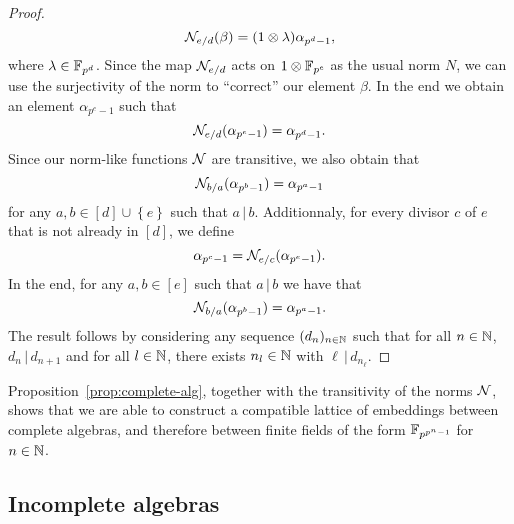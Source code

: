 \documentclass{sig-alternate}
\begin{document}
\begin{proof}
\[
  \mathcal{N}_{e/d}(\beta)=(1\otimes\lambda)\alpha_{p^{d}-1},
\]
where $\lambda\in\mathbb{F}_{p^d}$. Since the map
$\mathcal{N}_{e/d}$ acts on $1\otimes\mathbb{F}_{p^{e}}$ as the
usual norm $N$, we can use
the surjectivity of the norm to ``correct'' our element $\beta$. In the end we
obtain an element $\alpha_{p^{e}-1}$ such
that
\[
  \mathcal{N}_{e/d}(\alpha_{p^{e}-1}) = \alpha_{p^{d}-1}.
\]
Since our norm-like functions $\mathcal{N}$ are transitive, we also obtain that
\[
  \mathcal{N}_{b/a}(\alpha_{p^b-1})=\alpha_{p^a-1}
\]
for any $a,b\in \left[ d \right]\cup\left\{ e \right\}$ such that
$a\,|\,b$. Additionnaly, for every divisor $c$ of $e$ that is not already in $\left[
d \right]$, we define
\[
  \alpha_{p^c-1}=\mathcal{N}_{e/c}(\alpha_{p^{e}-1}).
\]
In the end, for any $a, b\in\left[ e \right]$ such that
$a\,|\,b$ we have that
\[
  \mathcal{N}_{b/a}(\alpha_{p^b-1})=\alpha_{p^a-1}.
\]
The result follows by considering any sequence $(d_n)_{n\in\mathbb{N}}$ such
that for all $n\in\mathbb{N}$, $d_n\,|\,d_{n+1}$ and for all
$l\in\mathbb{N}$, there exists $n_l\in\mathbb{N}$ with
$\ell\,|\,d_{n_\ell}$.
\end{proof}

Proposition~\ref{prop:complete-alg}, together with the transitivity of the
norms $\mathcal{N}$,
shows that we are able to construct a compatible lattice of embeddings between
complete algebras, and therefore between finite fields of the form
$\mathbb{F}_{p^{p^n-1}}$ for $n\in\mathbb{N}$.

\subsection{Incomplete algebras}
\end{document}
